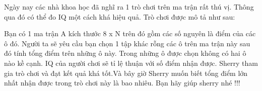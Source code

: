 Ngày nay các nhà khoa học đã nghĩ ra 1 trò chơi trên ma trận rất thú vị. Thông qua đó có thể đo IQ một cách khá hiệu quả. Trò chơi được mô tả như sau:  

   Bạn có 1 ma trận A kích thước 8 x N trên đó gồm các số nguyên là điểm của các ô đó. Người ta sẽ yêu cầu bạn chọn 1 tập khác rỗng các ô trên ma trận này sau đó tính tổng điểm trên những ô này. Trong những ô được chọn không có hai ô nào kề cạnh. IQ của người chơi sẽ tỉ lệ thuận với số điểm nhận được. Sherry tham gia trò chơi và đạt kết quả khá tốt.Và bây giờ Sherry muốn biết tổng điểm lớn nhất nhận được trong trò chơi này là bao nhiêu. Bạn hãy giúp sherry nhé !!!  

\